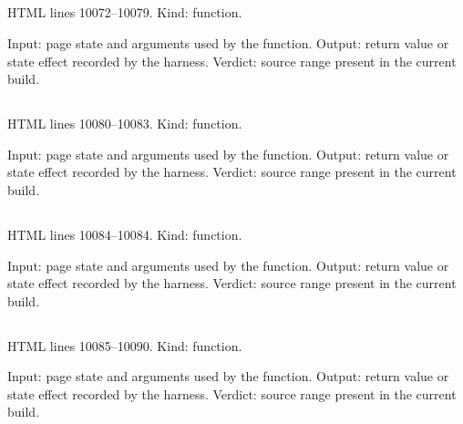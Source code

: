 \subsection*{\texttt{}}
\label{vf_555_downloadForensicCSV}
HTML lines 10072--10079. Kind: function.

Input: page state and arguments used by the function.
Output: return value or state effect recorded by the harness.
Verdict: source range present in the current build.

\subsection*{\texttt{}}
\label{vf_556_renderQualityReview}
HTML lines 10080--10083. Kind: function.

Input: page state and arguments used by the function.
Output: return value or state effect recorded by the harness.
Verdict: source range present in the current build.

\subsection*{\texttt{}}
\label{vf_557_renderQualityReviewLazy}
HTML lines 10084--10084. Kind: function.

Input: page state and arguments used by the function.
Output: return value or state effect recorded by the harness.
Verdict: source range present in the current build.

\subsection*{\texttt{}}
\label{vf_558_showReviewSheet}
HTML lines 10085--10090. Kind: function.

Input: page state and arguments used by the function.
Output: return value or state effect recorded by the harness.
Verdict: source range present in the current build.

